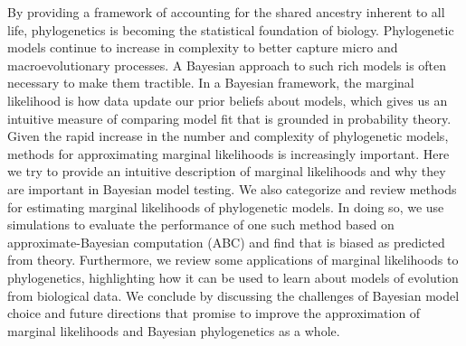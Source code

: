 By providing a framework of accounting for the shared ancestry inherent to all
life,
phylogenetics is becoming the statistical foundation of biology.
Phylogenetic models continue to increase in complexity to better capture
micro and macroevolutionary processes.
A Bayesian approach to such rich models is often necessary to make them
tractible.
In a Bayesian framework, 
the marginal likelihood is how data update our prior beliefs about models,
which gives us an intuitive measure of comparing model fit that is grounded in
probability theory.
Given the rapid increase in the number and complexity of phylogenetic models,
methods for approximating marginal likelihoods is increasingly important.
Here we try to provide an intuitive description of marginal likelihoods and why
they are important in Bayesian model testing.
We also categorize and review methods for estimating marginal likelihoods of
phylogenetic models.
In doing so, we use simulations to evaluate the performance of one such method
based on approximate-Bayesian computation (ABC) and find that is biased as
predicted from theory.
Furthermore, we review some applications of marginal likelihoods to
phylogenetics, highlighting how it can be used to learn about models of
evolution from biological data.
We conclude by discussing the challenges of Bayesian model choice and future
directions that promise to improve the approximation of marginal likelihoods
and Bayesian phylogenetics as a whole.
